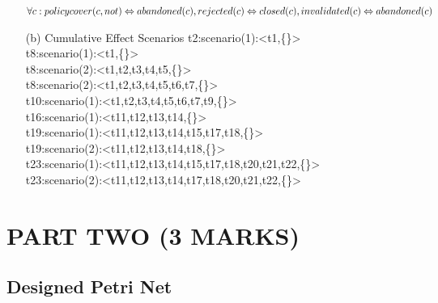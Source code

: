 \documentclass[runningheads]{llncs}
\begin{document}
\begin{itemize}
$\forall c: policycover(c, not) \Leftrightarrow abandoned(c), \\ rejected(c) \Leftrightarrow closed(c), \\ invalidated(c) \Leftrightarrow abandoned(c) $
\\



\item[(b)]{Cumulative Effect Scenarios}
t2:scenario(1):<t1,\{<t2>\}>\\
t8:scenario(1):<t1,\{<t8>\}>\\
t8:scenario(2):<t1,t2,t3,t4,t5,\{<t8>\}> \\
t8:scenario(2):<t1,t2,t3,t4,t5,t6,t7,\{<t8>\}> \\          
t10:scenario(1):<t1,t2,t3,t4,t5,t6,t7,t9,\{<t10>\}>\\
t16:scenario(1):<t11,t12,t13,t14,\{<t16>\}>    \\
t19:scenario(1):<t11,t12,t13,t14,t15,t17,t18,\{<t19>\}>\\
t19:scenario(2):<t11,t12,t13,t14,t18,\{<t19>\}> \\
t23:scenario(1):<t11,t12,t13,t14,t15,t17,t18,t20,{t21,t22},\{<t23>\}>\\
t23:scenario(2):<t11,t12,t13,t14,t17,t18,t20,{t21,t22},\{<t23>\}>\\           

\end{itemize}

\section{PART TWO (3 MARKS)}
\subsection{Designed Petri Net}
\end{document}
